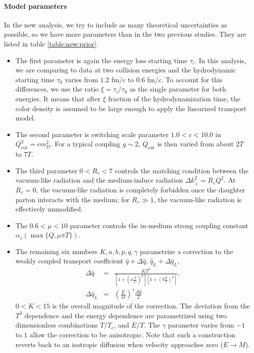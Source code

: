 \paragraph{Model parameters}
In the new analysis, we try to include as many theoretical uncertainties as possible, so we have more parameters than in the two previous studies.
They are listed in table \ref{table:new:prior}.
\begin{itemize}
\item The first parameter is again the energy loss starting time $\tau_i$.
In this analysis, we are comparing to data at two collision energies and the hydrodynamic starting time $\tau_0$ varies from $1.2$ fm/$c$ to $0.6$ fm/$c$.
To account for this differences, we use the ratio $\xi = \tau_i/\tau_0$ as the single parameter for both energies.
It means that after $\xi$ fraction of the hydrodynamization time, the color density is assumed to be large enough to apply the linearized transport model.
\item The second parameter is switching scale parameter $1.0 < c < 10.0$ in $Q_{\textrm{cut}}^2 = c m_D^2$. For a typical coupling $g\sim 2$, $Q_{\textrm{cut}}$ is then varied from about $2T$ to $7T$.
\item The third parameter $0<R_v<7$ controls the matching condition between the vacuum-like radiation and the medium-induce radiation $\Delta k_\perp^2 = R_v Q^2$.
At $R_v = 0$, the vacuum-like radiation is completely forbidden once the daughter parton interacts with the medium; for $R_v \gg 1$, the vacuum-like radiation is effectively unmodified.
\item The $0.6 < \mu < 10$ parameter controls the in-medium strong coupling constant $\alpha_s(\max\{Q, \mu\pi T\})$.
\item The remaining six numbers $K,a,b,p,q, \gamma$ parametrize a correction to the weakly coupled transport coefficient $\hat{q} + \Delta\hat{q}$, $\hat{q}_L + \Delta\hat{q}_L$,
\begin{eqnarray}
\Delta\hat{q} &=& \frac{K T^3}{\left[1+\left(a\frac{T}{T_c}\right)^p\right]\left[1+\left(b\frac{E}{T}\right)^q\right]}, \\
\Delta\hat{q}_L &=& \left(\frac{E}{M}\right)^\gamma \frac{\Delta\hat{q}}{2}
\end{eqnarray}
$0 < K < 15$ is the overall magnitude of the correction. 
The deviation from the $T^3$ dependence and the energy dependence are parametrized using two dimensionless combinations $T/T_c$, and $E/T$.
The $\gamma$ parameter varies from $-1$ to $1$ allow the correction to be anisotropic.
Note that such a construction reverts back to an isotropic diffusion when velocity approaches zero ($E\rightarrow M$).
\end{itemize}

